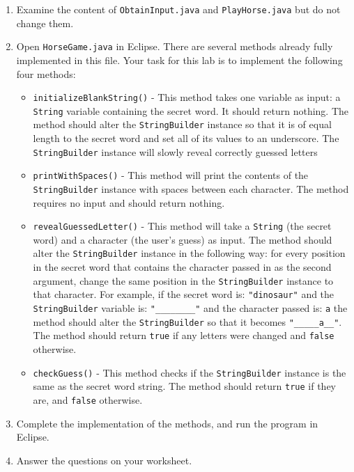 \documentclass[12pt]{scrartcl}
\begin{document}
\begin{enumerate}
  \item Examine the content of \texttt{ObtainInput.java} and 
  	\texttt{PlayHorse.java} but do not change them.
  \item Open \texttt{HorseGame.java} in Eclipse.  There are several 
	methods already fully implemented in this file.  Your task for this lab is to 
	implement the following four methods:
	\begin{itemize}
	  \item \texttt{initializeBlankString()} - This method takes one variable 
	  as input: a \texttt{String} variable containing the secret word.  It 
	  should return nothing.   The method should alter the \texttt{StringBuilder} 
	  instance so that it is of equal length to the secret word and set all of its values to 
	  an underscore.  The \texttt{StringBuilder} instance will slowly reveal 
	  correctly guessed letters
	  \item \texttt{printWithSpaces()} - This method will print the contents 
	  of the \texttt{StringBuilder} instance with spaces between each character.   
	  The method requires no input and should return nothing.
	  \item \texttt{revealGuessedLetter()} - This method will take a 
	  \texttt{String} (the secret word) and a character (the user's guess) as input.   
	  The method should alter the \texttt{StringBuilder} instance in the 
	  following way: for every position in the secret word that contains the character 
	  passed in as the second argument, change the same position in the 
	  \texttt{StringBuilder} instance to that character.  For example, if the 
	  secret word is: \texttt{"dinosaur"} and the \texttt{StringBuilder}
	  variable is: \texttt{"________"} and the character passed is: \texttt{a}
	  the method should alter the \texttt{StringBuilder} so that it becomes 
	  \texttt{"_____a__"}.  The method should return \texttt{true} 
	  if any letters were changed and \texttt{false} otherwise.
	  \item \texttt{checkGuess()} - This method checks if the 
	  \texttt{StringBuilder} instance is the same as the secret word string.  
	  The method should return \texttt{true} if they are, and 
	  \texttt{false} otherwise.
	\end{itemize}
  \item Complete the implementation of the methods, and run the program in Eclipse.
  \item Answer the questions on your worksheet.
\end{enumerate}
\end{document}
